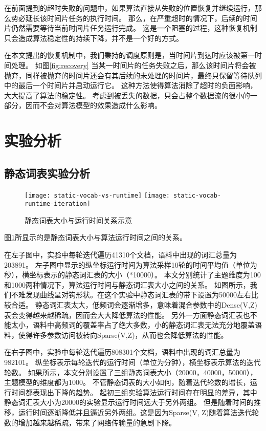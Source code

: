 在前面提到的超时失败的问题中，如果算法直接从失败的位置恢复并继续运行，那么势必延长该时间片任务的执行时间。
那么，在严重超时的情况下，后续的时间片仍然需要等待当前时间片任务运行完成。
这是一个阻塞的过程，这种恢复机制只会造成算法稳定性的持续下降，并不是一个好的方式。

在本文提出的恢复机制中，我们秉持的调度原则是，当时间片到达时应该被第一时间处理。
如图\ref{fig:recovery}
当某一时间片的任务失败之后，那么该时间片将会被抛弃，同样被抛弃的时间片还会有其后续的未处理的时间片，最终只保留等待队列中的最后一个时间片并启动运行它。
这种方法使得算法消除了超时的负面影响，大大提高了算法的稳定性。
考虑到被丢失的数据，只会占整个数据流的很小的一部分，因而不会对算法模型的效果造成什么影响。

\section{实验分析}

\subsection{静态词表实验分析}
\begin{figure}[htb]\centering
\texttt{[image: static-vocab-vs-runtime]}
\texttt{[image: static-vocab-runtime-iteration]}
\caption{静态词表大小与运行时间关系示意}
\label{fig:static-vocab-runtime}       %
\end{figure}

图\ref{fig:static-vocab-runtime}所显示的是静态词表大小与算法运行时间之间的关系。

在左子图中，实验中每轮迭代遍历41310个文档，语料中出现的词汇总量为203891。
左子图中显示的纵坐标运行时间为算法采样10轮的时间平均值（单位为秒），横坐标表示的静态词汇表的大小（*10000）。
本文分别统计了主题维度为100和1000两种情况下，算法运行时间与静态词汇表大小之间的关系。
如图所示，我们不难发现曲线呈对钩形状。在这个实验中静态词汇表的带下设置为50000左右比较合适。
静态词汇表太大，低频词会逐渐增多，意味着混合参数中的Dense(V,Z)表会变得越来越稀疏，因而会大大降低算法的性能。
另外一方面静态词汇表也不能太小，语料中高频词的覆盖率占了绝大多数，小的静态词汇表无法充分地覆盖语料，使得许多参数访问被转向Sparse(V,Z)，从而也会降低算法的性能。

在右子图中，实验中每轮迭代遍历808301个文档，语料中出现的词汇总量为982101。
纵坐标表示每轮迭代的运行时间（单位为分钟），横坐标表示算法的迭代轮数。
如果所示，本文分别设置了三组静态词表大小（20000，40000，50000），主题模型的维度都为1000。
不管静态词表的大小如何，随着迭代轮数的增长，运行时间都表现出下降的趋势。
起初三组实验算法运行时间存在明显的差异，其中静态词汇表大小为20000的实验显示运行时间远大于另外两组。
但是随着时间的推移，运行时间逐渐降低并且逼近另外两组。这是因为Sparse(V, Z)随着算法迭代轮数的增加越来越稀疏，带来了网络传输量的急剧下降。

